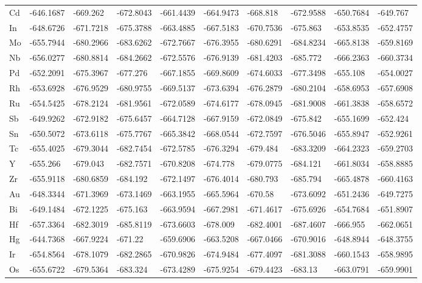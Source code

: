 \begin{table}[h]
{\begin{tabular}{*{10}{l}}
      Cd	& -646.1687	&-669.262	  &-672.8043	&-661.4439	&-664.9473	&-668.818	  &-672.9588	&-650.7684	&-649.767  \\
      In	& -648.6726	&-671.7218	&-675.3788	&-663.4885	&-667.5183	&-670.7536	&-675.863	  &-653.8535	&-652.4757 \\
      Mo	& -655.7944	&-680.2966	&-683.6262	&-672.7667	&-676.3955	&-680.6291	&-684.8234	&-665.8138	&-659.8169 \\
      Nb	& -656.0277	&-680.8814	&-684.2662	&-672.5576	&-676.9139	&-681.4203	&-685.772	  &-666.2363	&-660.3734 \\
      Pd	& -652.2091	&-675.3967	&-677.276	  &-667.1855	&-669.8609	&-674.6033	&-677.3498	&-655.108	  &-654.0027 \\
      Rh	& -653.6928	&-676.9529	&-680.9755	&-669.5137	&-673.6394	&-676.2879	&-680.2104	&-658.6953	&-657.6908 \\
      Ru	& -654.5425	&-678.2124	&-681.9561	&-672.0589	&-674.6177	&-678.0945	&-681.9008	&-661.3838	&-658.6572 \\
      Sb	& -649.9262	&-672.9182	&-675.6457	&-664.7128	&-667.9159	&-672.0849	&-675.842  	&-655.1699	&-652.424  \\
      Sn	& -650.5072	&-673.6118	&-675.7767	&-665.3842	&-668.0544	&-672.7597	&-676.5046	&-655.8947	&-652.9261 \\
      Tc	& -655.4025	&-679.3044	&-682.7454	&-672.5785	&-676.3294	&-679.484	  &-683.3209	&-664.2323	&-659.2703 \\
      Y	  & -655.266	&-679.043 	&-682.7571	&-670.8208	&-674.778	  &-679.0775	&-684.121	  &-661.8034	&-658.8885 \\
      Zr	& -655.9118	&-680.6859	&-684.192	  &-672.1497	&-676.4014	&-680.793	  &-685.794	  &-665.4878	&-660.4163 \\
      Au	& -648.3344	&-671.3969	&-673.1469	&-663.1955	&-665.5964	&-670.58		&-673.6092	&-651.2436	&-649.7275 \\
      Bi	& -649.1484	&-672.1225	&-675.163	  &-663.9594	&-667.2981	&-671.4617	&-675.6926	&-654.7684	&-651.8907 \\
      Hf	& -657.3364	&-682.3019	&-685.8119	&-673.6603	&-678.009	  &-682.4001	&-687.4607	&-666.955	  &-662.0651 \\
      Hg	& -644.7368	&-667.9224	&-671.22		&-659.6906	&-663.5208	&-667.0466	&-670.9016	&-648.8944	&-648.3755 \\
      Ir	& -654.8564	&-678.1079	&-682.2865	&-670.9826	&-674.9484	&-677.4097	&-681.3088	&-660.1543	&-658.9895 \\
      Os	& -655.6722	&-679.5364	&-683.324	  &-673.4289	&-675.9254	&-679.4423	&-683.13		&-663.0791	&-659.9901 \\

\end{tabular}}
\end{table}
